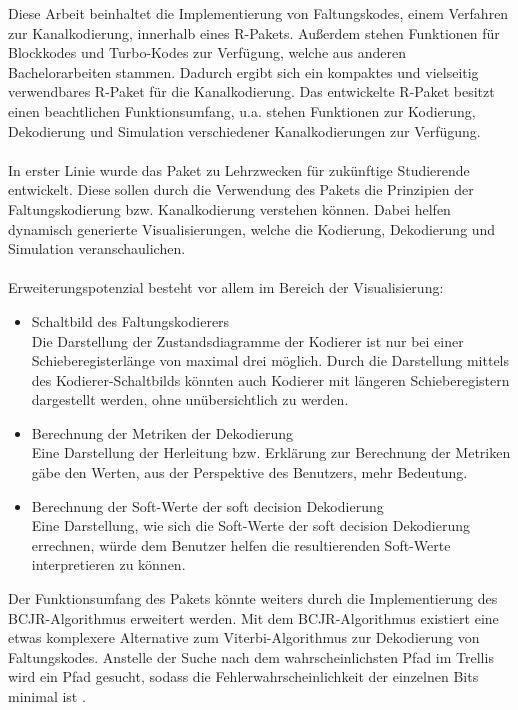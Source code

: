 Diese Arbeit beinhaltet die Implementierung von Faltungskodes, einem Verfahren zur Kanalkodierung, innerhalb eines R-Pakets. Außerdem stehen Funktionen für Blockkodes und Turbo-Kodes zur Verfügung, welche aus anderen Bachelorarbeiten stammen. Dadurch ergibt sich ein kompaktes und vielseitig verwendbares R-Paket für die Kanalkodierung. Das entwickelte R-Paket besitzt einen beachtlichen Funktionsumfang, u.a. stehen Funktionen zur Kodierung, Dekodierung und Simulation verschiedener Kanalkodierungen zur Verfügung.
\\
\\
In erster Linie wurde das Paket zu Lehrzwecken für zukünftige Studierende entwickelt. Diese sollen durch die Verwendung des Pakets die Prinzipien der Faltungskodierung bzw. Kanalkodierung verstehen können. Dabei helfen dynamisch generierte Visualisierungen, welche die Kodierung, Dekodierung und Simulation veranschaulichen.
\\
\\
Erweiterungspotenzial besteht vor allem im Bereich der Visualisierung:
\begin{itemize}
\item Schaltbild des Faltungskodierers\\Die Darstellung der Zustandsdiagramme der Kodierer ist nur bei einer Schieberegisterlänge von maximal drei möglich. Durch die Darstellung mittels des Kodierer-Schaltbilds könnten auch Kodierer mit längeren Schieberegistern dargestellt werden, ohne unübersichtlich zu werden.
\item Berechnung der Metriken der Dekodierung\\Eine Darstellung der Herleitung bzw. Erklärung zur Berechnung der Metriken gäbe den Werten, aus der Perspektive des Benutzers, mehr Bedeutung.
\item Berechnung der Soft-Werte der soft decision Dekodierung\\Eine Darstellung, wie sich die Soft-Werte der soft decision Dekodierung errechnen, würde dem Benutzer helfen die resultierenden Soft-Werte interpretieren zu können.
\end{itemize}
Der Funktionsumfang des Pakets könnte weiters durch die Implementierung des BCJR-Algorithmus erweitert werden. Mit dem BCJR-Algorithmus existiert eine etwas komplexere Alternative zum Viterbi-Algorithmus zur Dekodierung von Faltungskodes. Anstelle der Suche nach dem wahrscheinlichsten Pfad im Trellis wird ein Pfad gesucht, sodass die Fehlerwahrscheinlichkeit der einzelnen Bits minimal ist \cite[S.~233~ff.]{schonfeld2012informations}.